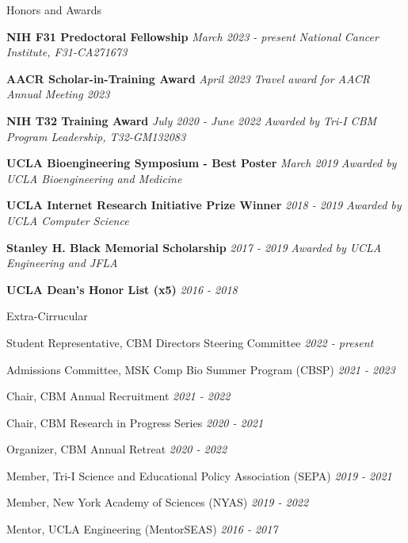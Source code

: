 \documentclass{resume} %
\begin{document}
\begin{rSection}{Honors and Awards}


\item \textbf{NIH F31 Predoctoral Fellowship} \hfill {\em March 2023 - present}
\newline
\textit{National Cancer Institute, F31-CA271673}

\item \textbf{AACR Scholar-in-Training Award} \hfill {\em April 2023}
\newline
\textit{Travel award for AACR Annual Meeting 2023}

\item \textbf{NIH T32 Training Award} \hfill {\em July 2020 - June 2022}
\newline
\textit{Awarded by Tri-I CBM Program Leadership, T32-GM132083}

\item \textbf{UCLA Bioengineering Symposium - Best Poster} \hfill {\em March 2019}
\newline
\textit{Awarded by UCLA Bioengineering and Medicine}

\item \textbf{UCLA Internet Research Initiative Prize Winner} \hfill {\em 2018 - 2019}
\newline
\textit{Awarded by UCLA Computer Science}

\item \textbf{Stanley H. Black Memorial Scholarship} \hfill {\em 2017 - 2019}
\newline
\textit{Awarded by UCLA Engineering and JFLA}

\item \textbf{UCLA Dean’s Honor List (x5)} \hfill {\em 2016 - 2018}

\end{rSection}



\begin{rSection}{Extra-Cirrucular} \itemsep -3pt
\item Student Representative, CBM Directors Steering Committee \hfill {\em 2022 - present}
\item Admissions Committee, MSK Comp Bio Summer Program (CBSP) \hfill {\em 2021 - 2023}
\item Chair, CBM Annual Recruitment \hfill {\em 2021 - 2022}
\item Chair, CBM Research in Progress Series \hfill {\em 2020 - 2021}
\item Organizer, CBM Annual Retreat \hfill {\em 2020 - 2022}
\item Member, Tri-I Science and Educational Policy Association (SEPA) \hfill {\em 2019 - 2021}
\item Member, New York Academy of Sciences (NYAS) \hfill {\em 2019 - 2022}
\item Mentor, UCLA Engineering (MentorSEAS) \hfill {\em 2016 - 2017}

\end{rSection}
\end{document}
